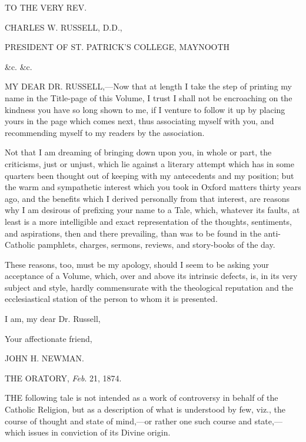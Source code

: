 




TO THE VERY REV.

CHARLES W. RUSSELL, D.D.,

PRESIDENT OF ST. PATRICK'S COLLEGE, MAYNOOTH

\&c. \&c.


MY DEAR
DR. RUSSELL,—Now
that at length I take the step of printing my name in the Title-page of
this Volume, I trust I shall not be encroaching on the kindness you have
so long shown to me, if I venture to follow it up by placing yours in
the page which comes next, thus associating myself with you, and
recommending myself to my readers by the association.


Not that I am dreaming of bringing down upon you, in
whole or part, the criticisms, just or unjust, which lie against a
literary attempt which has in some quarters been thought out of keeping
with my antecedents and my position; but the warm and sympathetic
interest which you took in Oxford matters thirty years ago, and the
benefits which I derived personally from that interest, are reasons why
I am desirous of prefixing your name to a Tale, which, whatever its
faults, at least is a more intelligible and exact representation of the
thoughts, sentiments, and aspirations, then and there prevailing, than
was to be found in the anti-Catholic pamphlets, charges, sermons,
reviews, and story-books of the day.


These reasons, too, must be my apology, should I seem to
be asking your acceptance of a Volume, which, over and above its
intrinsic defects, is, in its very subject and style, hardly
commensurate with the theological reputation and the ecclesiastical
station of the person to whom it is presented.


I am, my dear Dr. Russell,

Your affectionate friend,

JOHN H. NEWMAN.


THE ORATORY,
\emph{Feb}. 21, 1874.












THE following tale is not
intended as a work of controversy in behalf of the Catholic Religion,
but as a description of what is understood by few, viz., the course of
thought and state of mind,—or rather one such course and state,—which
issues in conviction of its Divine origin.


